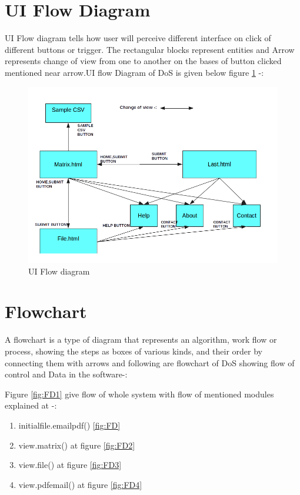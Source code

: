 \section{UI Flow Diagram}
UI Flow diagram tells how user will perceive different interface on click of different buttons or trigger. The rectangular blocks represent entities and Arrow represents change of view from one to another on the bases of button clicked mentioned near arrow.UI flow Diagram of DoS is given below figure \ref{fig:UI1} -: 
\begin{figure}[H]
\centering \includegraphics[scale=0.55]{images/UI.png}
\caption{UI Flow diagram}
\label{fig:UI1}
\end{figure}
\section{Flowchart}
A flowchart is a type of diagram that represents an algorithm, work flow or process, showing the steps as boxes of various kinds, and their order by connecting them with arrows
and following are flowchart of DoS showing flow of control and Data in the software-:

Figure \ref{fig:FD1} give flow of whole system with flow of mentioned modules explained at -:
\begin{enumerate}

\item initialfile.emailpdf() \ref{fig:FD}
\item view.matrix() at figure \ref{fig:FD2}
\item view.file() at figure \ref{fig:FD3}
\item view.pdfemail() at figure \ref{fig:FD4}
\end{enumerate}

